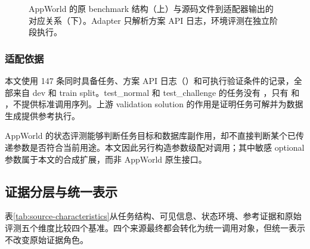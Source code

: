 \begin{figure}[t]
  \caption{AppWorld 的原 benchmark 结构（上）与源码文件到适配器输出的对应关系（下）。Adapter 只解析方案 API 日志，环境评测在独立阶段执行。}
  \label{fig:appworld-structure}
\end{figure}

\subsubsection{适配依据}

本文使用 147 条同时具备任务、方案 API 日志（）和可执行验证条件的记录，全部来自 dev 和 train split。test\_normal 和 test\_challenge 的任务没有 ，只有  和 ，不提供标准调用序列。上游 validation solution 的作用是证明任务可解并为数据生成提供参考执行。

AppWorld 的状态评测能够判断任务目标和数据库副作用，却不直接判断某个已传递参数是否符合当前用途。本文因此另行构造参数级配对调用；其中敏感 optional 参数属于本文的合成扩展，而非 AppWorld 原生接口。

\subsection{证据分层与统一表示}

表\ref{tab:source-characteristics}从任务结构、可见信息、状态环境、参考证据和原始评测五个维度比较四个基准。四个来源最终都会转化为统一调用对象，但统一表示不改变原始证据角色。


